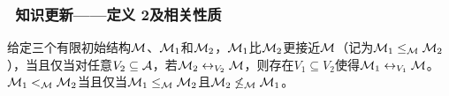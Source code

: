 \documentclass[9pt, CJK]{beamer}
\begin{document}
	\begin{frame}
		\frametitle{~知识更新——{\footnotesize 定义 2及相关性质}}
		{\footnotesize
			\begin{definition}\label{def:closer}
				给定三个有限初始结构${\cal M}$、${\cal M}_1$和${\cal M}_2$，${\cal M}_1$比${\cal M}_2$更接近${\cal M}$（记为${\cal M}_1 \leq_{{\cal M}} {\cal M}_2$），当且仅当对任意$V_2 \subseteq {\cal A}$，若${\cal M}_2 \leftrightarrow_{V_2} {\cal M}$，则存在$V_1 \subseteq V_2$使得${\cal M}_1 \leftrightarrow_{V_1} {\cal M}$。
				${\cal M}_1 <_{{\cal M}} {\cal M}_2$当且仅当${\cal M}_1 \leq_{{\cal M}} {\cal M}_2$且${\cal M}_2 \not \leq_{{\cal M}} {\cal M}_1$。
			\end{definition}
			
			}
\end{frame}
\end{document}

